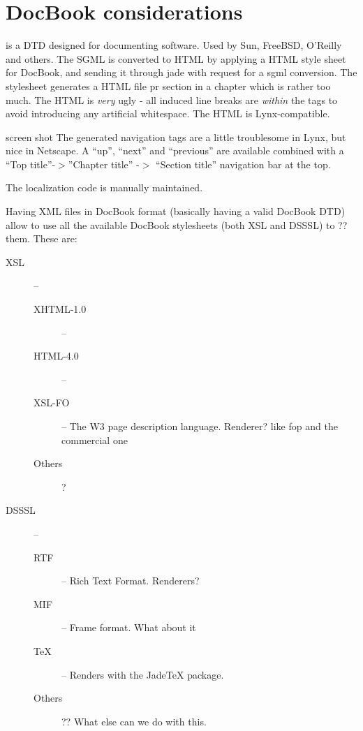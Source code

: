 
\section{DocBook considerations}
\textsf{ is a DTD designed for
documenting software.  Used by Sun, FreeBSD, O'Reilly and others.
}
\textsf{
The SGML is converted to HTML by applying a HTML style sheet for
DocBook, and sending it through jade with request for a sgml
conversion.  The stylesheet generates a HTML file pr section in a
chapter which is rather too much.  The HTML is \textit{very} ugly - all
induced line breaks are \textit{within} the tags to avoid introducing any
artificial whitespace.  The HTML is Lynx-compatible.
}

\textsf{screen shot}
The generated navigation tags are a little troublesome in Lynx, but
nice in Netscape.  A ``up'', ``next'' and ``previous'' are available
combined with a ``Top title''-$>$''Chapter title'' -$>$ ``Section title''
navigation bar at the top.

The localization code is manually maintained.

Having XML files in DocBook format (basically having a valid DocBook
DTD) allow to use all the available DocBook stylesheets (both XSL and
DSSSL) to \textsf{??} them.  These are:

\begin{description}
\item[XSL] --
  \begin{description}
  \item[XHTML-1.0] -- 
  \item[HTML-\textsf{4.0}] -- 
  \item[XSL-FO] -- The W3 page description language.
    \textsf{Renderer? like fop and the commercial one}
  \item[\textsf{Others}] ?
  \end{description}
\item[DSSSL] --
  \begin{description}
  \item[RTF] -- Rich Text Format.  \textsf{Renderers?}
    
  \item[MIF] -- Frame format.   \textsf{What about it}
  \item[{\TeX}] -- Renders with the \textsf{JadeTeX} package.
  \item[\textsf{Others}] ?? What else can we do with this.
  \end{description}
\end{description}

